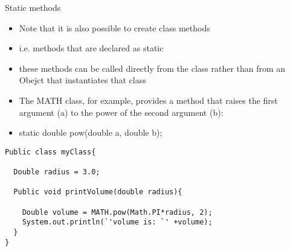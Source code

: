 \documentclass{beamer}
\begin{document}
\begin{frame}

Static methods

\begin{itemize}
\item Note that it is also possible to create class methods
\item i.e. methods that are declared as static
\item these methods can be called directly from the class rather than from an Obejct that instantiates that class
\item The MATH class, for example, provides a method that raises the first argument (a) to the power of the second
argument (b):
\item static double pow(double a, double b);

\end{itemize} 
\end{frame}
\begin{frame}[fragile]
\begin{block}{}
\begin{lstlisting}
Public class myClass{

  Double radius = 3.0; 

  Public void printVolume(double radius){

    Double volume = MATH.pow(Math.PI*radius, 2);
    System.out.println(`'volume is: `' +volume);
  } 
}
\end{lstlisting}
\end{block}
\end{frame} 
\end{document}
